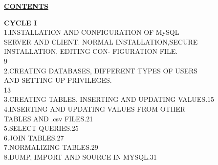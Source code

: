 \documentclass{article}
\begin{document}
\newpage
{\begin{flushleft}
\begin{center}
    \textbf{\Huge\underline {CONTENTS}}
\end{center}
\vspace{0.3in}\hspace{2.5in} \textbf{\Large CYCLE I}\\
\vspace{0.5in}1.\hspace{1in}INSTALLATION AND CONFIGURATION OF MySQL\\\hspace{1in} SERVER AND CLIENT.
NORMAL INSTALLATION,SECURE\\ \hspace{1in} INSTALLATION, EDITING CON-
FIGURATION FILE.\\ \vspace{-0.4in}\hspace{5.8in}9\\
\vspace{0.5in}2.\hspace{1in}CREATING DATABASES, DIFFERENT TYPES OF USERS\\\hspace{1in} AND SETTING UP PRIVILEGES.\\  \vspace{-0.3in}\hspace{5.8in}13\\
\vspace{0.5in}3.\hspace{1in}CREATING TABLES, INSERTING AND UPDATING VALUES.\hspace{0.7in}15\\
\vspace{0.5in}4.\hspace{1in}INSERTING AND UPDATING VALUES FROM OTHER\\ \hspace{1in} TABLES AND .csv FILES.\hspace{3.1in}21\\
\vspace{0.5in}5.\hspace{1in}SELECT QUERIES.\hspace{3.43in}25\\
\vspace{0.5in}6.\hspace{1in}JOIN TABLES.\hspace{3.74in}27\\
\vspace{0.5in}7.\hspace{1in}NORMALIZING TABLES.\hspace{3.04in}29\\
\vspace{0.5in}8.\hspace{1in}DUMP, IMPORT AND SOURCE IN MYSQL.\hspace{1.85in}31\\

\end{flushleft}}
\end{document}

